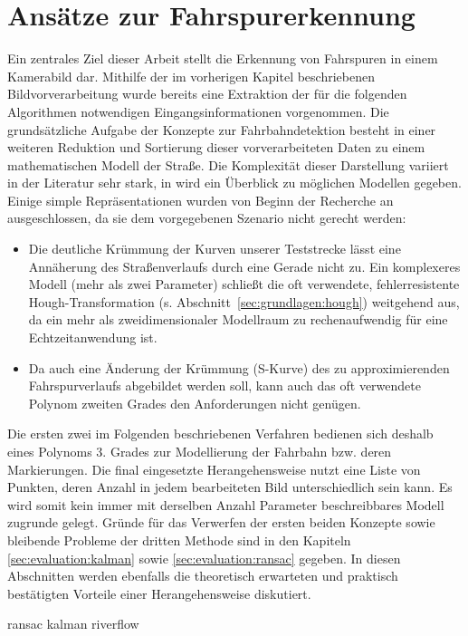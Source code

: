 \chapter{Ansätze zur Fahrspurerkennung \dcsecondauthorshort}
\label{cha:fahrspurerkennung}
Ein zentrales Ziel dieser Arbeit stellt die Erkennung von Fahrspuren in einem Kamerabild dar. Mithilfe der im vorherigen Kapitel beschriebenen Bildvorverarbeitung wurde bereits eine Extraktion der für die folgenden Algorithmen notwendigen Eingangsinformationen vorgenommen. Die grundsätzliche Aufgabe der Konzepte zur Fahrbahndetektion besteht in einer weiteren Reduktion und Sortierung dieser vorverarbeiteten Daten zu einem mathematischen Modell der Straße. Die Komplexität dieser Darstellung variiert in der Literatur sehr stark, in \autocite{naroteReviewRecentAdvances2018} wird ein Überblick zu möglichen Modellen gegeben. Einige simple Repräsentationen wurden von Beginn der Recherche an ausgeschlossen, da sie dem vorgegebenen Szenario nicht gerecht werden: 
\begin{itemize}
\item Die deutliche Krümmung der Kurven unserer Teststrecke lässt eine Annäherung des Straßenverlaufs durch eine Gerade nicht zu. Ein komplexeres Modell (mehr als zwei Parameter) schließt die oft verwendete, fehlerresistente Hough-Transformation (s. Abschnitt~\ref{sec:grundlagen:hough}) weitgehend aus, da ein mehr als zweidimensionaler Modellraum zu rechenaufwendig für eine Echtzeitanwendung ist. 
\item Da auch eine Änderung der Krümmung (S-Kurve) des zu approximierenden Fahrspurverlaufs abgebildet werden soll, kann auch das oft verwendete Polynom zweiten Grades den Anforderungen nicht genügen. 
\end{itemize}
Die ersten zwei im Folgenden beschriebenen Verfahren bedienen sich deshalb eines Polynoms 3. Grades zur Modellierung der Fahrbahn bzw. deren Markierungen. Die final eingesetzte Herangehensweise nutzt eine Liste von Punkten, deren Anzahl in jedem bearbeiteten Bild unterschiedlich sein kann. Es wird somit kein immer mit derselben Anzahl Parameter beschreibbares Modell zugrunde gelegt. Gründe für das Verwerfen der ersten beiden Konzepte sowie bleibende Probleme der dritten Methode sind in den Kapiteln \ref{sec:evaluation:kalman} sowie \ref{sec:evaluation:ransac} gegeben. In diesen Abschnitten werden ebenfalls die theoretisch erwarteten und praktisch bestätigten Vorteile einer Herangehensweise diskutiert.

{ransac}
{kalman}
{riverflow}
